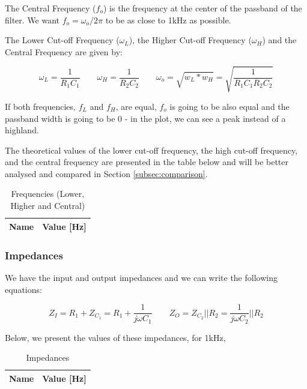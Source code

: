The Central Frequency ($f_o$) is the frequency at the center of the passband of the filter. We want $f_o=\omega_o/2\pi$ to be as close to 1kHz as possible.
\par
The Lower Cut-off Frequency ($\omega_L$), the Higher Cut-off Frequency ($\omega_H$) and the Central Frequency are given by:

\begin{equation}
    \omega_L=\frac{1}{R_1C_1} \qquad \omega_H=\frac{1}{R_2C_2} \qquad \omega_o=\sqrt{w_L*w_H}=\sqrt{\frac{1}{R_1C_1R_2C_2}}
\end{equation}

If both frequencies, $f_L$ and $f_H$, are equal, $f_o$ is going to be also equal and the passband width is going to be 0 - in the plot, we can see a peak instead of a highland.

The theoretical values of the lower cut-off frequency, the high cut-off frequency, and the central frequency are presented in the table below and will be better analysed and compared in Section \ref{subsec:comparison}.

\begin{table}[h]
   \centering
   \begin{tabular}{|l|c|}
   \hline
   {\bf Name} & {\bf Value [Hz]} \\ \hline
   
   \end{tabular}
   \caption{Frequencies (Lower, Higher and Central)}
   \label{tab:theo_freq}
\end{table}

\subsubsection{Impedances}

We have the input and output impedances and we can write the following equations:

\begin{equation}
    Z_I=R_1+Z_{C_1}=R_1+\frac{1}{j\omega C_1} \qquad Z_O=Z_{C_2} || R_2 = \frac{1}{j\omega C_2} || R_2
\end{equation}

Below, we present the values of these impedances, for 1kHz,

\begin{table}[h]
    \centering
    \begin{tabular}{|l|c|}
    \hline
    {\bf Name} & {\bf Value [Hz]} \\ \hline
    
   \end{tabular}
   \caption{Impedances}
   \label{tab:theo_imp}
\end{table}

